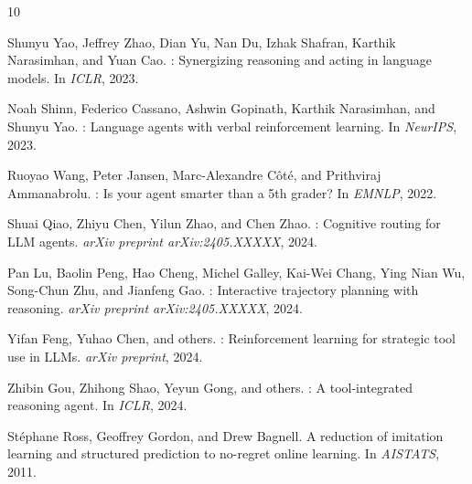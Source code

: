 \documentclass[11pt,a4paper]{article}
\begin{document}


\begin{thebibliography}{10}

Shunyu Yao, Jeffrey Zhao, Dian Yu, Nan Du, Izhak Shafran, Karthik Narasimhan, and Yuan Cao.
: Synergizing reasoning and acting in language models.
\newblock In \emph{ICLR}, 2023.

Noah Shinn, Federico Cassano, Ashwin Gopinath, Karthik Narasimhan, and Shunyu Yao.
: Language agents with verbal reinforcement learning.
\newblock In \emph{NeurIPS}, 2023.

Ruoyao Wang, Peter Jansen, Marc-Alexandre C\^ot\'e, and Prithviraj Ammanabrolu.
: Is your agent smarter than a 5th grader?
\newblock In \emph{EMNLP}, 2022.

Shuai Qiao, Zhiyu Chen, Yilun Zhao, and Chen Zhao.
: Cognitive routing for LLM agents.
\newblock \emph{arXiv preprint arXiv:2405.XXXXX}, 2024.

Pan Lu, Baolin Peng, Hao Cheng, Michel Galley, Kai-Wei Chang, Ying Nian Wu, Song-Chun Zhu, and Jianfeng Gao.
: Interactive trajectory planning with reasoning.
\newblock \emph{arXiv preprint arXiv:2405.XXXXX}, 2024.

Yifan Feng, Yuhao Chen, and others.
: Reinforcement learning for strategic tool use in LLMs.
\newblock \emph{arXiv preprint}, 2024.

Zhibin Gou, Zhihong Shao, Yeyun Gong, and others.
: A tool-integrated reasoning agent.
\newblock In \emph{ICLR}, 2024.

St\'ephane Ross, Geoffrey Gordon, and Drew Bagnell.
\newblock A reduction of imitation learning and structured prediction to no-regret online learning.
\newblock In \emph{AISTATS}, 2011.

\end{thebibliography}
\end{document}
